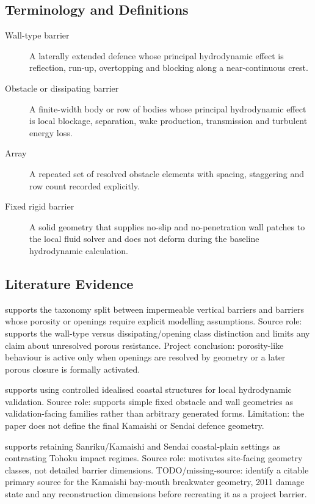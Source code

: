 \subsection{Terminology and Definitions}
\label{sec:res-geo-tax-definitions}

\begin{description}
  \item[Wall-type barrier] A laterally extended defence whose principal
    hydrodynamic effect is reflection, run-up, overtopping and
    blocking along a near-continuous crest.
  \item[Obstacle or dissipating barrier] A finite-width body or row of
    bodies whose principal hydrodynamic effect is local blockage,
    separation, wake production, transmission and turbulent energy
    loss.
  \item[Array] A repeated set of resolved obstacle elements with
    spacing, staggering and row count recorded explicitly.
  \item[Fixed rigid barrier] A solid geometry that supplies no-slip and
    no-penetration wall patches to the local fluid solver and does not
    deform during the baseline hydrodynamic calculation.
\end{description}

\subsection{Literature Evidence}
\label{sec:res-geo-tax-literature-evidence}

\textcite{deljesus2012porous} supports the taxonomy split between
impermeable vertical barriers and barriers whose porosity or openings
require explicit modelling assumptions. Source role: supports the
wall-type versus dissipating/opening class distinction and limits any
claim about unresolved porous resistance. Project conclusion:
porosity-like behaviour is active only when openings are resolved by
geometry or a later porous closure is formally activated.

\textcite{watanabe2022validation} supports using controlled idealised
coastal structures for local hydrodynamic validation. Source role:
supports simple fixed obstacle and wall geometries as validation-facing
families rather than arbitrary generated forms. Limitation: the paper
does not define the final Kamaishi or Sendai defence geometry.

\textcite{mori2012nationwide} supports retaining Sanriku/Kamaishi and
Sendai coastal-plain settings as contrasting Tohoku impact regimes.
Source role: motivates site-facing geometry classes, not detailed
barrier dimensions. TODO/missing-source: identify a citable primary
source for the Kamaishi bay-mouth breakwater geometry, 2011 damage
state and any reconstruction dimensions before recreating it as a
project barrier.

